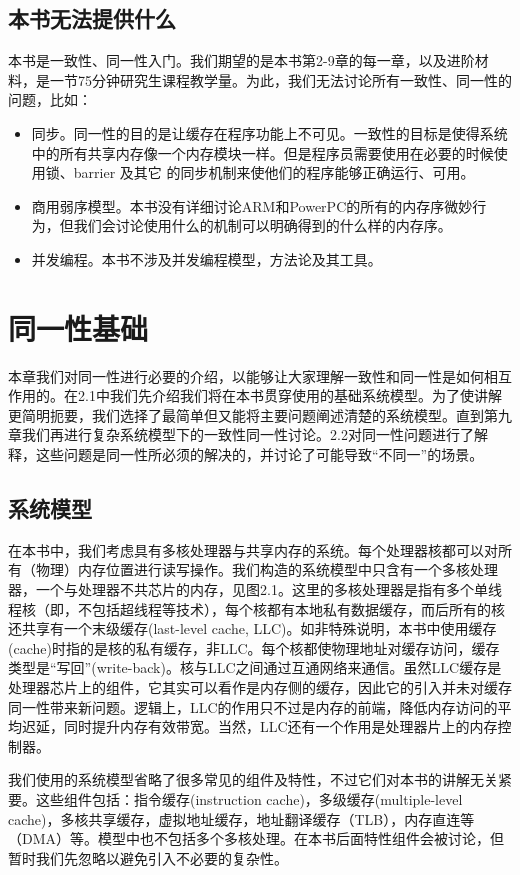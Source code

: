 \documentclass[UTF-8]{ctexrep}
\begin{document}
\section{本书无法提供什么}
\par 本书是一致性、同一性入门。我们期望的是本书第2-9章的每一章，以及进阶材料，是一节75分钟研究生课程教学量。为此，我们无法讨论所有一致性、同一性的问题，比如：
\begin{itemize}
\item 同步。同一性的目的是让缓存在程序功能上不可见。一致性的目标是使得系统中的所有共享内存像一个内存模块一样。但是程序员需要使用在必要的时候使用锁、barrier 及其它 的同步机制来使他们的程序能够正确运行、可用。
\item 商用弱序模型。本书没有详细讨论ARM和PowerPC的所有的内存序微妙行为，但我们会讨论使用什么的机制可以明确得到的什么样的内存序。
\item 并发编程。本书不涉及并发编程模型，方法论及其工具。
\end{itemize}
\chapter{同一性基础}
本章我们对同一性进行必要的介绍，以能够让大家理解一致性和同一性是如何相互作用的。在2.1中我们先介绍我们将在本书贯穿使用的基础系统模型。为了使讲解更简明扼要，我们选择了最简单但又能将主要问题阐述清楚的系统模型。直到第九章我们再进行复杂系统模型下的一致性同一性讨论。2.2对同一性问题进行了解释，这些问题是同一性所必须的解决的，并讨论了可能导致“不同一”的场景。
\section{系统模型}
在本书中，我们考虑具有多核处理器与共享内存的系统。每个处理器核都可以对所有（物理）内存位置进行读写操作。我们构造的系统模型中只含有一个多核处理器，一个与处理器不共芯片的内存，见图2.1。这里的多核处理器是指有多个单线程核（即，不包括超线程等技术），每个核都有本地私有数据缓存，而后所有的核还共享有一个末级缓存(last-level cache, LLC)。如非特殊说明，本书中使用缓存(cache)时指的是核的私有缓存，非LLC。每个核都使物理地址对缓存访问，缓存类型是“写回”(write-back)。核与LLC之间通过互通网络来通信。虽然LLC缓存是处理器芯片上的组件，它其实可以看作是内存侧的缓存，因此它的引入并未对缓存同一性带来新问题。逻辑上，LLC的作用只不过是内存的前端，降低内存访问的平均迟延，同时提升内存有效带宽。当然，LLC还有一个作用是处理器片上的内存控制器。
\par 我们使用的系统模型省略了很多常见的组件及特性，不过它们对本书的讲解无关紧要。这些组件包括：指令缓存(instruction cache)，多级缓存(multiple-level cache)，多核共享缓存，虚拟地址缓存，地址翻译缓存（TLB），内存直连等（DMA）等。模型中也不包括多个多核处理。在本书后面特性组件会被讨论，但暂时我们先忽略以避免引入不必要的复杂性。
\end{document}
